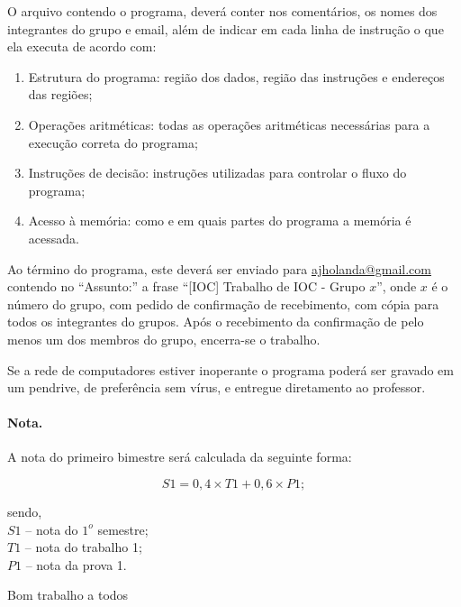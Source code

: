 \documentclass[12pt,a4paper]{article}
\begin{document}
O arquivo contendo o programa, deverá conter nos comentários, os nomes
dos integrantes do grupo e email, além de indicar em cada linha de
instrução o que ela executa de acordo com:

\begin{enumerate}
\item Estrutura do programa: região dos dados, região das instruções e
  endereços das regiões;
\item Operações aritméticas: todas as operações aritméticas
  necessárias para a execução correta do programa;
\item Instruções de decisão: instruções utilizadas para controlar o
  fluxo do programa;
\item Acesso à memória: como e em quais partes do programa a memória é acessada.
\end{enumerate}

Ao término do programa, este deverá ser enviado para
\href{mailto:ajholanda@gmail.com}{ajholanda@gmail.com} contendo no
``Assunto:'' a frase ``[IOC] Trabalho de IOC - Grupo $x$'', onde $x$ é o
número do grupo, com pedido de confirmação de recebimento, com cópia
para todos os integrantes do grupos. Após o recebimento da confirmação
de pelo menos um dos membros do grupo, encerra-se o trabalho.

Se a rede de computadores estiver inoperante o programa poderá ser
gravado em um pendrive, de preferência sem vírus, e entregue
diretamento ao professor.

\paragraph{Nota.} A nota do primeiro bimestre será calculada da
seguinte forma:

\begin{equation}
  \label{eq:nota1bim}
  S1 = {0,4 \times T1 + 0,6 \times P1};
\end{equation}

\noindent sendo,\\
$S1$ -- nota do $1^o$ semestre;\\
$T1$ -- nota do trabalho 1;\\
$P1$ -- nota da prova 1.

\hfill {\large Bom trabalho a todos}\\
\end{document}
